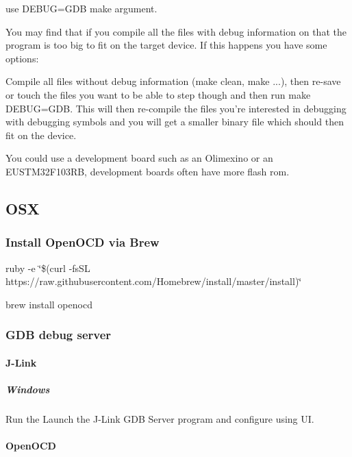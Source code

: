 use {\ttfamily D\+E\+B\+U\+G=G\+D\+B} make argument.

You may find that if you compile all the files with debug information on that the program is too big to fit on the target device. If this happens you have some options\+:


\begin{DoxyItemize}
\item Compile all files without debug information ({\ttfamily make clean}, {\ttfamily make ...}), then re-\/save or {\ttfamily touch} the files you want to be able to step though and then run {\ttfamily make D\+E\+B\+U\+G=G\+D\+B}. This will then re-\/compile the files you're interested in debugging with debugging symbols and you will get a smaller binary file which should then fit on the device.
\item You could use a development board such as an Olimexino or an E\+U\+S\+T\+M32\+F103\+R\+B, development boards often have more flash rom.
\end{DoxyItemize}

\subsection*{O\+S\+X}

\subsubsection*{Install Open\+O\+C\+D via Brew}

ruby -\/e \char`\"{}\$(curl -\/fs\+S\+L https\+://raw.\+githubusercontent.\+com/\+Homebrew/install/master/install)\char`\"{}

brew install openocd

\subsubsection*{G\+D\+B debug server}

\paragraph*{J-\/\+Link}

\subparagraph*{Windows}

Run the Launch the J-\/\+Link G\+D\+B Server program and configure using U\+I.

\paragraph*{Open\+O\+C\+D}

